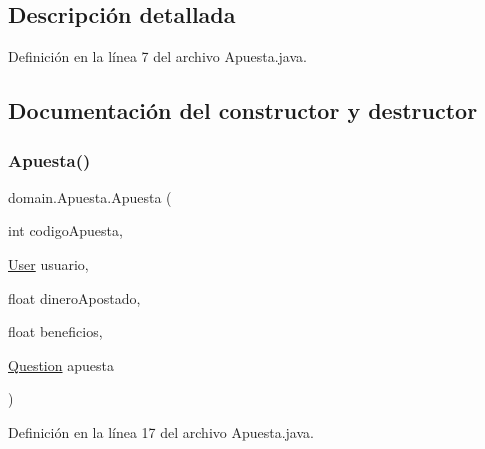 \subsection{Descripción detallada}


Definición en la línea 7 del archivo Apuesta.\+java.



\subsection{Documentación del constructor y destructor}
\mbox{\label{classdomain_1_1Apuesta_a470f63c3f95a850ee19b7ef39ba8808e}} 
\subsubsection{\texorpdfstring{Apuesta()}{Apuesta()}}
{\footnotesize\ttfamily domain.\+Apuesta.\+Apuesta (\begin{DoxyParamCaption}\item[{int}]{codigo\+Apuesta,  }\item[{\mbox{\hyperlink{classdomain_1_1User}{User}}}]{usuario,  }\item[{float}]{dinero\+Apostado,  }\item[{float}]{beneficios,  }\item[{\mbox{\hyperlink{classdomain_1_1Question}{Question}}}]{apuesta }\end{DoxyParamCaption})}



Definición en la línea 17 del archivo Apuesta.\+java.


